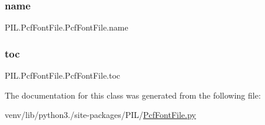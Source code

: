 \subsubsection{\texorpdfstring{name}{name}}
{\footnotesize\ttfamily P\+I\+L.\+Pcf\+Font\+File.\+Pcf\+Font\+File.\+name\hspace{0.3cm}{\ttfamily [static]}}

\mbox{\label{classPIL_1_1PcfFontFile_1_1PcfFontFile_a158c4819650cd6f1e6f6c0cdd5fd6646}} 
\subsubsection{\texorpdfstring{toc}{toc}}
{\footnotesize\ttfamily P\+I\+L.\+Pcf\+Font\+File.\+Pcf\+Font\+File.\+toc}



The documentation for this class was generated from the following file\+:\begin{DoxyCompactItemize}
\item 
venv/lib/python3./site-\/packages/\+P\+I\+L/\hyperlink{PcfFontFile_8py}{Pcf\+Font\+File.\+py}\end{DoxyCompactItemize}
